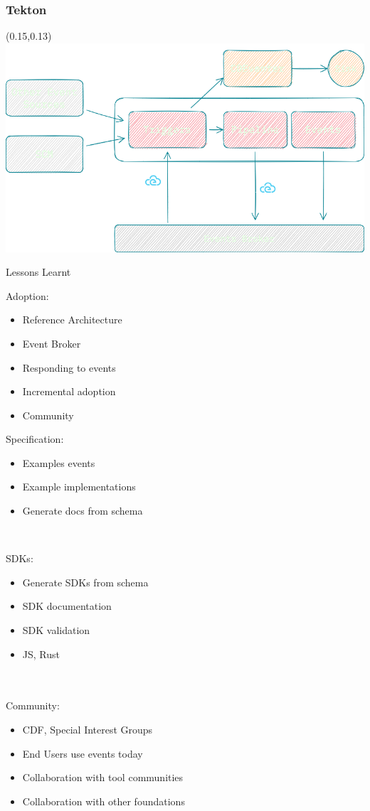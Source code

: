 \documentclass[aspectratio=169,11pt,hyperref={colorlinks=true}]{beamer}
\begin{document}
\begin{blackframe}
  \frametitle{Tekton}
  \begin{textblock*}{0.70\paperwidth}(0.15\paperwidth,0.13\paperheight)
    \includegraphics[width=0.70\paperwidth]{img/cdevents-Tekton.png}
  \end{textblock*}
\end{blackframe}

\begin{3squares}{Lessons Learnt}{%
  Adoption:
  \begin{itemize}
    \item Reference Architecture
    \item Event Broker
    \item Responding to events
    \item Incremental adoption
    \item Community
  \end{itemize}
}{%
  Specification:
  \begin{itemize}
    \item Examples events
    \item Example implementations
    \item Generate docs from schema
  \end{itemize}
  ~ \\
}{%
  SDKs:
  \begin{itemize}
    \item Generate SDKs from schema
    \item SDK documentation
    \item SDK validation
    \item JS, Rust
  \end{itemize}
  ~ \\
  ~ \\
  Community:
  \begin{itemize}
    \item CDF, Special Interest Groups
    \item End Users use events today
    \item Collaboration with tool communities
    \item Collaboration with other foundations
  \end{itemize}
}
\end{3squares}
\end{document}
